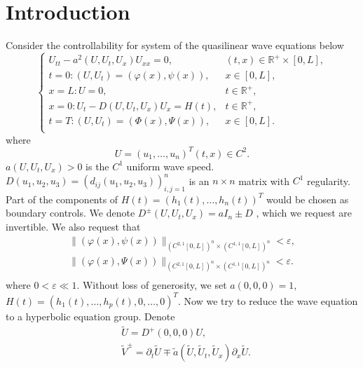 \documentclass[a4paper,reqno,11pt]{amsart}
\numberwithin{equation}{section} %
\begin{document}
\section{Introduction}\label{intro sec}
Consider the controllability for system of the quasilinear wave equations below
\begin{equation}\label{42}
    \begin{cases}
	U_{tt}-a^2\left( U,U_t,U_x \right) U_{xx}=0,&		\left( t,x \right) \in \mathbb{R}^+\times \left[ 0,L \right] ,\\
	t=0:\left( U,U_t \right) =\left( \varphi  \left( x \right) ,\psi \left( x \right) \right) ,&		x\in \left[ 0,L \right] ,\\
	x=L:U=0,&		t\in \mathbb{R}^+,\\
	x=0:U_t-D\left( U,U_t,U_x \right) U_x=H\left( t \right) ,&		t\in \mathbb{R}^+,\\
	t=T:\left( U,U_t \right) =\left( \varPhi   \left( x \right) ,\varPsi  \left( x \right) \right) ,&		x\in \left[ 0,L \right] .\\
\end{cases}
\end{equation}
where
$$
U=\left(u_1, \ldots, u_n\right)^T(t, x) \in C^2 .
$$
$a\left(U, U_t, U_x\right)>0$ is the $C^1$ uniform wave speed. $D\left(u_1, u_2, u_3\right)=\left(d_{i j}\left(u_1, u_2, u_3\right)\right)_{i, j=1}^n$ is an   $n \times n$ matrix with $C^1$ regularity. Part of the components of $H(t)=\left(h_1(t), \ldots, h_n(t)\right)^T$ would be chosen as boundary controls. We denote $D^{\pm}\left( U,U_t,U_x \right) =a I_n \pm D $ , which we request are invertible. We also request that
$$
\begin{aligned}
	\lVert \left( \varphi  \left( x \right) ,\psi \left( x \right) \right) \rVert _{\left( C^{2,1}\left[ 0,L \right] \right) ^n\times \left( C^{1,1}\left[ 0,L \right] \right) ^n}  < \varepsilon ,\\
	\lVert \left( \varphi  \left( x \right) ,\Psi \left( x \right) \right) \rVert _{\left( C^{2,1}\left[ 0,L \right] \right) ^n\times \left( C^{1,1}\left[ 0,L \right] \right) ^n}  < \varepsilon .\\
\end{aligned}
$$
where $0 < \varepsilon \ll 1$.
Without loss of generosity, we set $a(0,0,0)=1$, \ $H(t)=\left(h_1(t), \ldots, h_p(t), 0, \ldots, 0\right)^T$. Now we try to reduce the wave equation to a hyperbolic equation group. Denote
$$
\begin{aligned}
& \tilde{U}=D^{+}(0,0,0) U ,\\
& \tilde{V}^{\pm}=\partial_t \tilde{U} \mp \tilde{a} \left(\tilde{U}, \tilde{U}_t, \tilde{U}_x\right) \partial_x \tilde{U}.
\end{aligned}
$$
\end{document}
